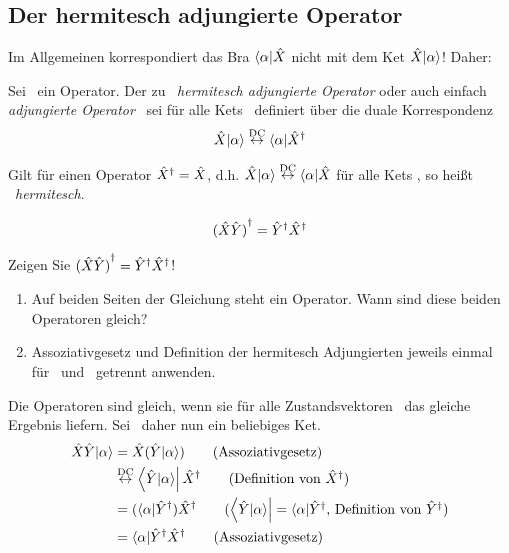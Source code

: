 \subsection{Der hermitesch adjungierte Operator}
\begin{notiz}
 Im Allgemeinen korrespondiert das Bra $\braa \opx$ nicht mit dem Ket $\opx \keta$! Daher:
\end{notiz}

\begin{defn}
 Sei \opx\ ein Operator. Der zu \opx\ \emph{hermitesch adjungierte Operator} oder auch einfach \emph{adjungierte Operator} \opxh\ sei f\"ur alle Kets \keta\ definiert \"uber die duale Korrespondenz
 \begin{equation}
  \opx \keta \dc \braa \opxh
 \end{equation}

\end{defn}

\begin{defn}
 Gilt f\"ur einen Operator ${\hat{X}}^{\dag} = \hat{X}$, d.h. $\opx \keta \dc \braa \opx$ f\"ur alle Kets \keta, so hei\ss{}t \opx\ \emph{hermitesch}.
\end{defn}

\begin{eig}
 \begin{equation}
  {(\ensuremath{\hat{X}}\ensuremath{\hat{Y}})}^{\dag} = {\hat{Y}}^{\dag} {\hat{X}}^{\dag}
 \end{equation}

\end{eig}
\begin{aufg}
 Zeigen Sie ${(\hat{X} \hat{Y})}^{\dag} = {\hat{Y}}^{\dag} {\hat{X}}^{\dag}$!
\end{aufg}
\begin{tipp}
\begin{enumerate}
 \item Auf beiden Seiten der Gleichung steht ein Operator. Wann sind diese beiden Operatoren gleich?
 \item Assoziativgesetz und Definition der hermitesch Adjungierten jeweils einmal f\"ur \opx\ und \opy\ getrennt anwenden.
\end{enumerate}
\end{tipp}
\begin{loes}
 Die Operatoren sind gleich, wenn sie f\"ur alle Zustandsvektoren \keta\ das gleiche Ergebnis liefern. Sei \keta\ daher nun ein beliebiges Ket.
 \begin{align}
  \opx \opy \keta &= \opx ( \opy \keta) \tag{Assoziativgesetz}\\
  &\dc \Bra{\opy \keta} \opxh \tag{Definition von \opxh}\\
  &= (\braa \opyh) \opxh \tag{$\Bra{\opy \keta} = \braa \opyh$, Definition von \opyh} \\
  &= \braa \opyh \opxh \tag{Assoziativgesetz}
 \end{align}

 \qedsymbol
\end{loes}

